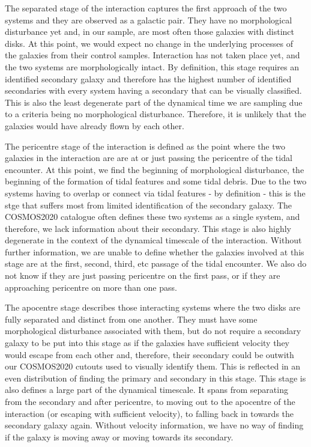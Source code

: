 The separated stage of the interaction captures the first approach of the two systems and they are observed as a galactic pair. They have no morphological disturbance yet and, in our sample, are most often those galaxies with distinct disks. At this point, we would expect no change in the underlying processes of the galaxies from their control samples. Interaction has not taken place yet, and the two systems are morphologically intact. By definition, this stage requires an identified secondary galaxy and therefore has the highest number of identified secondaries with every system having a secondary that can be visually classified. This is also the least degenerate part of the dynamical time we are sampling due to a criteria being no morphological disturbance. Therefore, it is unlikely that the galaxies would have already flown by each other.

The pericentre stage of the interaction is defined as the point where the two galaxies in the interaction are are at or just passing the pericentre of the tidal encounter. At this point, we find the beginning of morphological disturbance, the beginning of the formation of tidal features and some tidal debris. Due to the two systems having to overlap or connect via tidal features - by definition - this is the stge that suffers most from limited identification of the secondary galaxy. The COSMOS2020 catalogue often defines these two systems as a single system, and therefore, we lack information about their secondary. This stage is also highly degenerate in the context of the dynamical timescale of the interaction. Without further information, we are unable to define whether the galaxies involved at this stage are at the first, second, third, etc passage of the tidal encounter. We also do not know if they are just passing pericentre on the first pass, or if they are approaching pericentre on more than one pass.

The apocentre stage describes those interacting systems where the two disks are fully separated and distinct from one another. They must have some morphological disturbance associated with them, but do not require a secondary galaxy to be put into this stage as if the galaxies have sufficient velocity they would escape from each other and, therefore, their secondary could be outwith our COSMOS2020 cutouts used to visually identify them. This is reflected in an even distribution of finding the primary and secondary in this stage. This stage is also defines a large part of the dynamical timescale. It spans from separating from the secondary and after pericentre, to moving out to the apocentre of the interaction (or escaping with sufficient velocity), to falling back in towards the secondary galaxy again. Without velocity information, we have no way of finding if the galaxy is moving away or moving towards its secondary.

